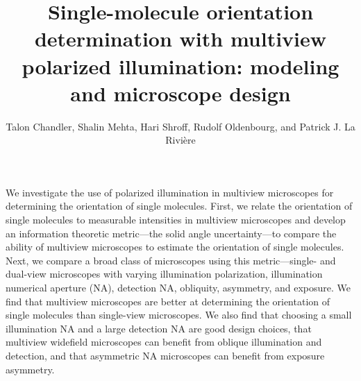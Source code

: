 \documentclass[10pt]{article}
\begin{document}
\title{Single-molecule orientation determination with multiview polarized
  illumination: modeling and microscope design}

\author{Talon Chandler, Shalin Mehta, Hari Shroff, Rudolf Oldenbourg, and Patrick J. La Rivi\`ere}
\address{University of Chicago, Department of Radiology, Chicago, Illinois 60637, USA\\
  Marine Biological Laboratory, Bell Center for Regenerative Medicine, Woods Hole, Massachusetts, USA\\
  Section on High Resolution Optical Imaging, National Institute
  of Biomedical Imaging and Bioengineering, National Institutes of Health,
  Bethesda, Maryland 20892, USA\\
  Whitman Center, Marine Biological Laboratory, Woods Hole,
  Massachusetts 02543, USA\\
  Brown University, Department of Physics, Providence, Rhode
  Island 02912, USA}

\begin{abstract*}
  We investigate the use of polarized illumination in multiview microscopes for
  determining the orientation of single molecules. First, we relate the
  orientation of single molecules to measurable intensities in multiview
  microscopes and develop an information theoretic metric---the solid angle
  uncertainty---to compare the ability of multiview microscopes to estimate the
  orientation of single molecules. Next, we compare a broad class of microscopes
  using this metric---single- and dual-view microscopes with varying
  illumination polarization, illumination numerical aperture (NA), detection NA,
  obliquity, asymmetry, and exposure. We find that multiview microscopes are
  better at determining the orientation of single molecules than single-view
  microscopes. We also find that choosing a small illumination NA and a large
  detection NA are good design choices, that multiview widefield microscopes can
  benefit from oblique illumination and detection, and that asymmetric NA
  microscopes can benefit from exposure asymmetry.
\end{abstract*}

\end{document}
